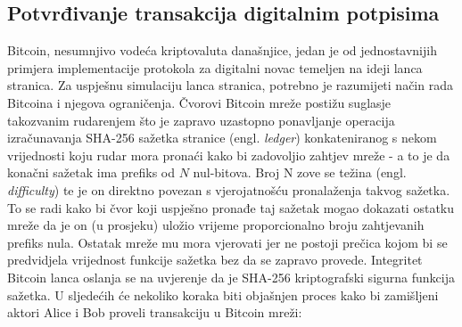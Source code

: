 \documentclass[utf8, zavrsni]{fer}
\begin{document}
\subsection{Potvrđivanje transakcija digitalnim potpisima}
Bitcoin, nesumnjivo vodeća kriptovaluta današnjice, jedan je od jednostavnijih primjera implementacije protokola za digitalni novac temeljen na ideji lanca stranica. Za uspješnu simulaciju lanca stranica, potrebno je razumijeti način rada Bitcoina i njegova ograničenja. Čvorovi Bitcoin mreže postižu suglasje takozvanim rudarenjem što je zapravo uzastopno ponavljanje operacija izračunavanja SHA-256 sažetka stranice (engl. \textit{ledger}) konkateniranog s nekom vrijednosti koju rudar mora pronaći kako bi zadovoljio zahtjev mreže - a to je da konačni sažetak ima prefiks od $N$ nul-bitova. Broj N zove se težina (engl. \textit{difficulty}) te je on direktno povezan s vjerojatnošću pronalaženja takvog sažetka. To se radi kako bi čvor koji uspješno pronađe taj sažetak mogao dokazati ostatku mreže da je on (u prosjeku) uložio vrijeme proporcionalno broju zahtjevanih prefiks nula. Ostatak mreže mu mora vjerovati jer ne postoji prečica kojom bi se predvidjela vrijednost funkcije sažetka bez da se zapravo provede. Integritet Bitcoin lanca oslanja se na uvjerenje da je SHA-256 kriptografski sigurna funkcija sažetka. U sljedećih će nekoliko koraka biti objašnjen proces kako bi zamišljeni aktori Alice i Bob proveli transakciju u Bitcoin mreži:
\end{document}
